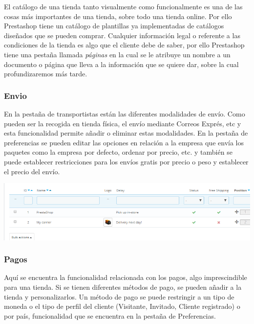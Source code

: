 \documentclass{article}
\begin{document}
El catálogo de una tienda tanto visualmente como funcionalmente es una de las cosas más importantes de una tienda, sobre todo una tienda online. Por ello Prestashop tiene un catálogo de plantillas ya implementadas de catálogos diseñados que se pueden comprar.
Cualquier información legal o referente a las condiciones de la tienda es algo que el cliente debe de saber, por ello Prestashop tiene una pestaña llamada \textit{páginas} en la cual se le atribuye un nombre a un documento o página que lleva a la información que se quiere dar, sobre la cual profundizaremos más tarde.

\subsubsection{Envio}

En la pestaña de transportistas están las diferentes modalidades de envío. Como pueden ser la recogida en tienda física, el envío mediante Correos Exprés, etc y esta funcionalidad permite añadir o eliminar estas modalidades.
En la pestaña de preferencias se pueden editar las opciones en relación a la empresa que envía los paquetes como la empresa por defecto, ordenar por precio, etc. y también se puede establecer restricciones para los envíos gratis por precio o peso y establecer el precio del envío.

\begin{center}
\includegraphics[scale=0.4]{images/envio.png}
\end{center}

\subsubsection{Pagos}

Aquí se encuentra la funcionalidad relacionada con los pagos, algo imprescindible para una tienda.  Si se tienen diferentes métodos de pago, se pueden añadir a la tienda y personalizarlos. Un método de pago se puede restringir a un tipo de moneda o el tipo de perfil del cliente (Visitante, Invitado, Cliente registrado) o por país, funcionalidad que se encuentra en la pestaña de Preferencias.
\end{document}

